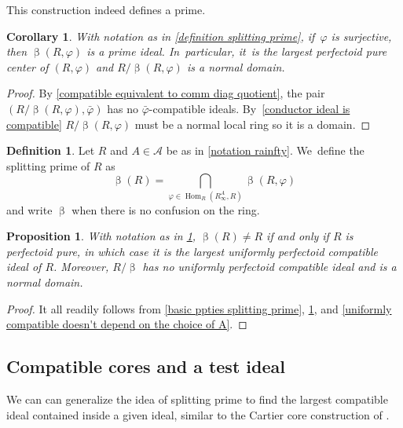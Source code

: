 \documentclass[JEP,XML,SOM,Unicode,published]{cedram}
\let\autoref\cref
\theoremstyle{plain}
\newtheorem{corollary}[theorem]{Corollary}
\newtheorem{proposition}[theorem]{Proposition}
\theoremstyle{definition}
\newtheorem{definition}[theorem]{Definition}
\numberwithin{equation}{theorem}
\DeclareMathOperator{\Hom}{Hom}
\newcommand{\sA}{\mathcal{A}}
\renewcommand{\phi}{\varphi}
\newcommand{\rphi}{(R,\phi)}
\newcommand{\rafty}{R^A_\infty}
\begin{document}
This construction indeed defines a prime.

\begin{corollary}\label{splitting prime is prime}
With notation as in \autoref{definition splitting prime}, if~$\phi$ is surjective, then $\upbeta\rphi$ is a prime ideal. In~particular, it~is the largest perfectoid pure center of $\rphi$ and $R/\upbeta\rphi$ is a normal domain.
\end{corollary}

\begin{proof}
By \autoref{compatible equivalent to comm diag quotient}, the pair $(R/\upbeta\rphi, \bar{\phi})$ has no $\bar{\phi}$-compatible ideals. By~\autoref{conductor ideal is compatible} $R/\upbeta\rphi$ must be a normal local ring so it is a domain.
\end{proof}

\begin{definition}\label{definition uniform splitting prime}
Let $R$ and $A\in\sA$ be as in \autoref{notation rainfty}. We~define the splitting prime of $R$ as
\[
\upbeta(R)=\bigcap_{\phi\in \Hom_R\left(\rafty,R\right)}\upbeta\rphi
\]
and write $\upbeta$ when there is no confusion on the ring.
\end{definition}

\begin{proposition}\label{basic properties uniform splitting prime}
With notation as in \autoref{definition uniform splitting prime}, $\upbeta(R)\neq R$ if and only if $R$ is perfectoid pure, in which case it is the largest uniformly perfectoid compatible ideal of $R$. Moreover, $R/\upbeta$ has no uniformly perfectoid compatible ideal and is a normal domain.
\end{proposition}

\begin{proof}
It all readily follows from \autoref{basic ppties splitting prime}, \autoref{splitting prime is prime}, and \autoref{uniformly compatible doesn't depend on the choice of A}.
\end{proof}

\subsection{Compatible cores and a test ideal}\label{section compatible cores}
We can can generalize the idea of splitting prime to find the largest compatible ideal contained inside a given ideal, similar to the Cartier core construction of \cite{BadillaCespedesFInvariantsSRRings,BrosowskyCartierCoreMap,CarvajalFayolleTameRamificationCFPS}.
\end{document}
